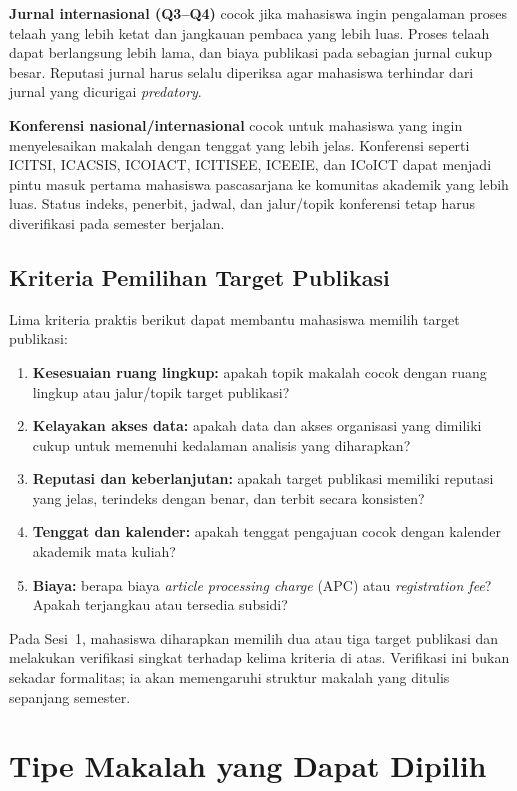 \textbf{Jurnal internasional (Q3--Q4)} cocok jika mahasiswa ingin pengalaman
proses telaah yang lebih ketat dan jangkauan pembaca yang lebih luas. Proses
telaah dapat berlangsung lebih lama, dan biaya publikasi pada sebagian jurnal
cukup besar. Reputasi jurnal harus selalu diperiksa agar mahasiswa terhindar
dari jurnal yang dicurigai \emph{predatory}.

\textbf{Konferensi nasional/internasional} cocok untuk mahasiswa yang ingin
menyelesaikan makalah dengan tenggat yang lebih jelas. Konferensi seperti
ICITSI, ICACSIS, ICOIACT, ICITISEE, ICEEIE, dan ICoICT dapat menjadi pintu
masuk pertama mahasiswa pascasarjana ke komunitas akademik yang lebih luas.
Status indeks, penerbit, jadwal, dan jalur/topik konferensi tetap harus
diverifikasi pada semester berjalan.

\subsection{Kriteria Pemilihan Target Publikasi}

Lima kriteria praktis berikut dapat membantu mahasiswa memilih target
publikasi:

\begin{enumerate}
  \item \textbf{Kesesuaian ruang lingkup:} apakah topik makalah cocok dengan
        ruang lingkup atau jalur/topik target publikasi?
  \item \textbf{Kelayakan akses data:} apakah data dan akses organisasi yang
        dimiliki cukup untuk memenuhi kedalaman analisis yang diharapkan?
  \item \textbf{Reputasi dan keberlanjutan:} apakah target publikasi memiliki
        reputasi yang jelas, terindeks dengan benar, dan terbit secara
        konsisten?
  \item \textbf{Tenggat dan kalender:} apakah tenggat pengajuan cocok dengan
        kalender akademik mata kuliah?
  \item \textbf{Biaya:} berapa biaya \emph{article processing charge} (APC)
        atau \emph{registration fee}? Apakah terjangkau atau tersedia subsidi?
\end{enumerate}

Pada Sesi~1, mahasiswa diharapkan memilih dua atau tiga target publikasi dan
melakukan verifikasi singkat terhadap kelima kriteria di atas. Verifikasi ini
bukan sekadar formalitas; ia akan memengaruhi struktur makalah yang ditulis
sepanjang semester.

\section{Tipe Makalah yang Dapat Dipilih}

